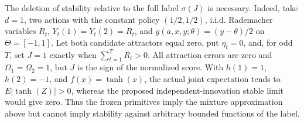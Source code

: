 The deletion of stability relative to the full label \(\sigma(J)\) is necessary. Indeed, take \(d=1\), two actions with the constant policy \((1/2,1/2)\), i.i.d. Rademacher variables \(R_t\), \(Y_t(1)=Y_t(2)=R_t\), and \(g(a,x,y;\theta)=(y-\theta)/2\) on \(\Theta=[-1,1]\). Let both candidate attractors equal zero, put \(\eta_t=0\), and, for odd \(T\), set \(J=1\) exactly when \(\sum_{t=1}^TR_t>0\). All attraction errors are zero and \(\Omega_1=\Omega_2=1\), but \(J\) is the sign of the normalized score. With \(h(1)=1\), \(h(2)=-1\), and \(f(x)=\tanh(x)\), the actual joint expectation tends to \(E|\tanh(Z)|>0\), whereas the proposed independent-innovation stable limit would give zero. Thus the frozen primitives imply the mixture approximation above but cannot imply stability against arbitrary bounded functions of the label.